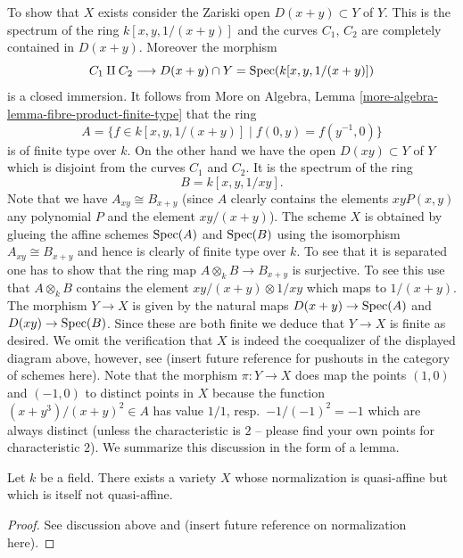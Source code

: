 \medskip\noindent
To show that $X$ exists consider the Zariski open
$D(x + y) \subset Y$ of $Y$. This is the spectrum
of the ring
$k[x, y, 1/(x + y)]$
and the curves $C_1$, $C_2$ are completely contained in
$D(x + y)$. Moreover the morphism
$$
C_1 \amalg C_2
\longrightarrow
D(x + y) \cap Y = \mathop{\mathrm{Spec}}(k[x, y, 1/(x + y)])
$$
is a closed immersion. It follows from
More on Algebra, Lemma \ref{more-algebra-lemma-fibre-product-finite-type}
that the ring
$$
A =
\{f \in k[x, y, 1/(x + y)] \mid f(0, y) = f(y^{-1}, 0)\}
$$
is of finite type over $k$. On the other hand we have the open
$D(xy) \subset Y$ of $Y$ which is disjoint from the curves $C_1$
and $C_2$. It is the spectrum of the ring
$$
B = k[x, y, 1/xy].
$$
Note that we have $A_{xy} \cong B_{x + y}$ (since $A$ clearly contains
the elements $xyP(x, y)$ any polynomial $P$ and the element $xy/(x + y)$).
The scheme $X$ is obtained by glueing the affine schemes
$\mathop{\mathrm{Spec}}(A)$ and $\mathop{\mathrm{Spec}}(B)$ using the isomorphism
$A_{xy} \cong B_{x + y}$ and hence is clearly of finite type over
$k$. To see that it is separated one has to show that the
ring map $A \otimes_k B \to B_{x + y}$ is surjective. To see
this use that $A \otimes_k B$ contains the element
$xy/(x + y) \otimes 1/xy$ which maps to $1/(x + y)$.
The morphism $Y \to X$ is given by the natural maps
$D(x + y) \to \mathop{\mathrm{Spec}}(A)$ and $D(xy) \to \mathop{\mathrm{Spec}}(B)$.
Since these are both finite we deduce that $Y \to X$ is finite
as desired. We omit the verification that $X$ is indeed the
coequalizer of the displayed diagram above, however, see
(insert future reference for pushouts in the category of schemes
here). Note that the morphism $\pi : Y \to X$ does
map the points  $(1, 0)$
and $(-1, 0)$ to distinct points in $X$ because the
function $(x + y^3)/(x + y)^2 \in A$ has value
$1/1$, resp.\ $-1/(-1)^2 = -1$ which are always distinct
(unless the characteristic is $2$ -- please find your own points
for characteristic $2$). We summarize this discussion in the
form of a lemma.

\begin{lemma}
\label{lemma-quasi-affine-normalization-not-quasi-affine}
Let $k$ be a field.
There exists a variety $X$ whose normalization is quasi-affine but
which is itself not quasi-affine.
\end{lemma}

\begin{proof}
See discussion above and (insert future reference on normalization here).
\end{proof}



